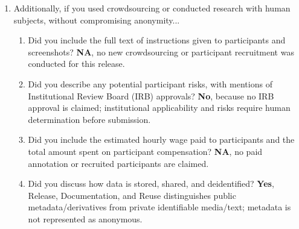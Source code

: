 \begin{enumerate}
\begin{enumerate}
\item Did you mention the license of the assets? \textbf{No}, because asset-specific redistribution/reuse review and the final dataset license remain pending; no blanket media license is asserted.
\item Did you include any new assets in the supplemental material or as a URL? \textbf{Yes}, the public repository and dashboard provide metadata, schemas, code and derived outputs; the required dataset DOI is TBD.
\item Did you discuss whether and how consent was obtained from people whose data you're using/curating? \textbf{Yes}, the paper states that public access does not establish consent and does not claim participant consent or institutional approval.
\item Did you discuss whether the data you are using/curating contains personally identifiable information or offensive content? \textbf{Yes}, voices, names and sensitive personal or spiritual material can be identifiable; the draft documents the restricted-source boundary.
\item If you are curating or releasing new datasets, did you discuss how you intend to make your datasets FAIR (see FORCE11 (2020))? \textbf{Yes}, Release, Documentation, and Reuse describes identifiers, standard formats, provenance and access levels; DOI completion remains pending.
\item If you are curating or releasing new datasets, did you create a Datasheet for the Dataset (see Gebru et al. (2021))? \textbf{Yes}, the accompanying dataset documentation records purpose, composition, collection, processing, uses, access and limitations; final human review is pending.
\end{enumerate}
\item Additionally, if you used crowdsourcing or conducted research with human subjects, without compromising anonymity...
\begin{enumerate}
\item Did you include the full text of instructions given to participants and screenshots? \textbf{NA}, no new crowdsourcing or participant recruitment was conducted for this release.
\item Did you describe any potential participant risks, with mentions of Institutional Review Board (IRB) approvals? \textbf{No}, because no IRB approval is claimed; institutional applicability and risks require human determination before submission.
\item Did you include the estimated hourly wage paid to participants and the total amount spent on participant compensation? \textbf{NA}, no paid annotation or recruited participants are claimed.
\item Did you discuss how data is stored, shared, and deidentified? \textbf{Yes}, Release, Documentation, and Reuse distinguishes public metadata/derivatives from private identifiable media/text; metadata is not represented as anonymous.
\end{enumerate}
\end{enumerate}
